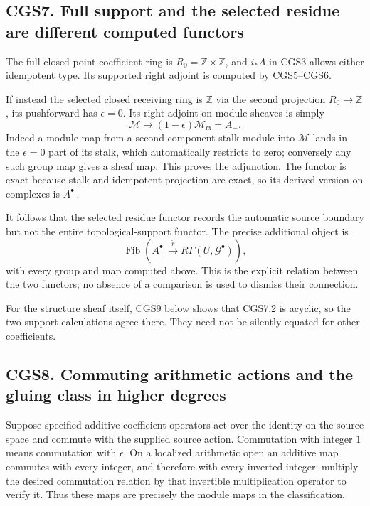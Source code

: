 \subsection{CGS7. Full support and the selected residue are different
computed
functors}\label{cgs7.-full-support-and-the-selected-residue-are-different-computed-functors}

The full closed-point coefficient ring is
\(R_0=\mathbb Z\times\mathbb Z\), and \(i_*A\) in CGS3 allows either
idempotent type. Its supported right adjoint is computed by CGS5--CGS6.

If instead the selected closed receiving ring is \(\mathbb Z\) via the
second projection \(R_0\to\mathbb Z\), its pushforward has
\(\epsilon=0\). Its right adjoint on module sheaves is simply \[
 \mathcal M\longmapsto (1-\epsilon)\mathcal M_{\mathfrak m}=A_-.
\tag{CGS7.1}
\] Indeed a module map from a second-component stalk module into
\(\mathcal M\) lands in the \(\epsilon=0\) part of its stalk, which
automatically restricts to zero; conversely any such group map gives a
sheaf map. This proves the adjunction. The functor is exact because
stalk and idempotent projection are exact, so its derived version on
complexes is \(A_-^\bullet\).

It follows that the selected residue functor records the automatic
source boundary but not the entire topological-support functor. The
precise additional object is \[
 \operatorname{Fib}\!\left(A_+^\bullet
       \xrightarrow{\widetilde r}R\Gamma(U,\mathcal G^\bullet)\right),
\tag{CGS7.2}
\] with every group and map computed above. This is the explicit
relation between the two functors; no absence of a comparison is used to
dismiss their connection.

For the structure sheaf itself, CGS9 below shows that CGS7.2 is acyclic,
so the two support calculations agree there. They need not be silently
equated for other coefficients.

\subsection{CGS8. Commuting arithmetic actions and the gluing class in
higher
degrees}\label{cgs8.-commuting-arithmetic-actions-and-the-gluing-class-in-higher-degrees}

Suppose specified additive coefficient operators act over the identity
on the source space and commute with the supplied source action.
Commutation with integer \(1\) means commutation with \(\epsilon\). On a
localized arithmetic open an additive map commutes with every integer,
and therefore with every inverted integer: multiply the desired
commutation relation by that invertible multiplication operator to
verify it. Thus these maps are precisely the module maps in the
classification.

